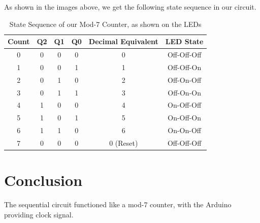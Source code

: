 \documentclass[a4paper,12pt]{article}
\begin{document}
As shown in the images above, we get the following state sequence in our circuit.

\begin{table}[H]
\centering
\begin{tabular}{cccccc}
\toprule
\textbf{Count} & \textbf{Q2} & \textbf{Q1} & \textbf{Q0} & \textbf{Decimal Equivalent} & \textbf{LED State} \\
\midrule
0 & 0 & 0 & 0 & 0 & Off-Off-Off \\
1 & 0 & 0 & 1 & 1 & Off-Off-On \\
2 & 0 & 1 & 0 & 2 & Off-On-Off \\
3 & 0 & 1 & 1 & 3 & Off-On-On \\
4 & 1 & 0 & 0 & 4 & On-Off-Off \\
5 & 1 & 0 & 1 & 5 & On-Off-On \\
6 & 1 & 1 & 0 & 6 & On-On-Off \\
7 & 0 & 0 & 0 & 0 (Reset) & Off-Off-Off \\
\bottomrule
\end{tabular}
\caption{State Sequence of our Mod-7 Counter, as shown on the LEDs}
\label{tab:states}
\end{table}

\section{Conclusion}
The sequential circuit functioned like a mod-7 counter, with the Arduino providing clock signal. 
\end{document}
